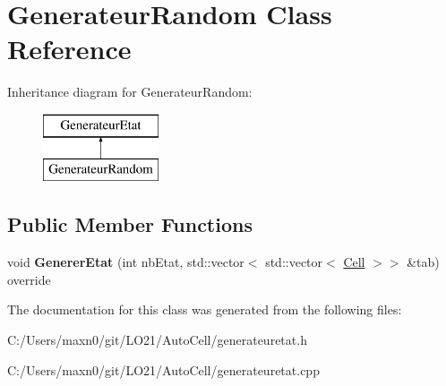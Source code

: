 \hypertarget{class_generateur_random}{}\section{Generateur\+Random Class Reference}
\label{class_generateur_random}
Inheritance diagram for Generateur\+Random\+:\begin{figure}[H]
\begin{center}
\leavevmode
\includegraphics[height=2.000000cm]{class_generateur_random}
\end{center}
\end{figure}
\subsection*{Public Member Functions}
\begin{DoxyCompactItemize}
\item 
\mbox{\label{class_generateur_random_ad6c15ee02504f5aa230068e5b1fa7a6b}} 
void {\bfseries Generer\+Etat} (int nb\+Etat, std\+::vector$<$ std\+::vector$<$ \mbox{\hyperlink{class_cell}{Cell}} $>$$>$ \&tab) override
\end{DoxyCompactItemize}


The documentation for this class was generated from the following files\+:\begin{DoxyCompactItemize}
\item 
C\+:/\+Users/maxn0/git/\+L\+O21/\+Auto\+Cell/generateuretat.\+h\item 
C\+:/\+Users/maxn0/git/\+L\+O21/\+Auto\+Cell/generateuretat.\+cpp\end{DoxyCompactItemize}
